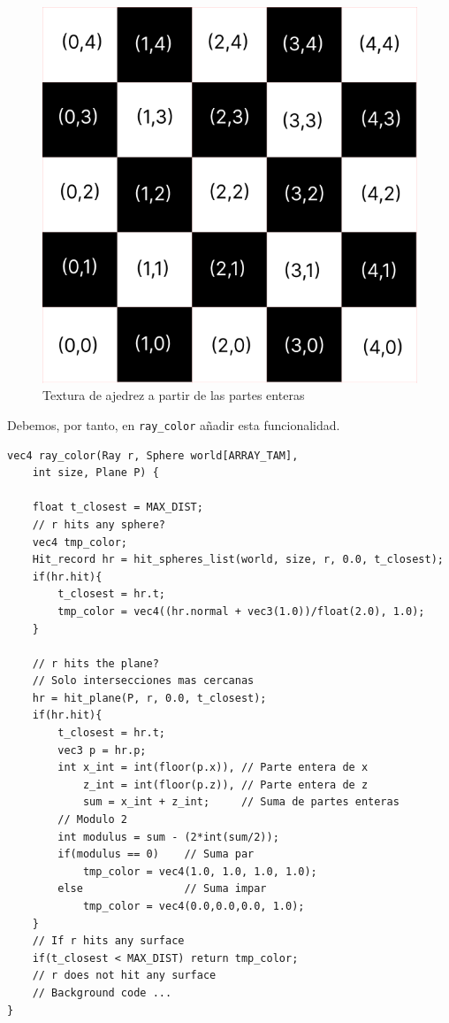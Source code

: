 \begin{figure} [ht]
    \centering
    \includegraphics[scale = 0.25]{img/C7/ajedrez.png}
    \caption{Textura de ajedrez a partir de las partes enteras}
    \label{fig:ajedrez}
\end{figure}

Debemos, por tanto, en \verb|ray_color| añadir esta funcionalidad.

\begin{lstlisting}
vec4 ray_color(Ray r, Sphere world[ARRAY_TAM], 
    int size, Plane P) {
    
    float t_closest = MAX_DIST;   
    // r hits any sphere?
    vec4 tmp_color;
    Hit_record hr = hit_spheres_list(world, size, r, 0.0, t_closest);
    if(hr.hit){
        t_closest = hr.t;
        tmp_color = vec4((hr.normal + vec3(1.0))/float(2.0), 1.0);
    }

    // r hits the plane? 
    // Solo intersecciones mas cercanas
    hr = hit_plane(P, r, 0.0, t_closest);
    if(hr.hit){
        t_closest = hr.t;
        vec3 p = hr.p;
        int x_int = int(floor(p.x)), // Parte entera de x
            z_int = int(floor(p.z)), // Parte entera de z
            sum = x_int + z_int;     // Suma de partes enteras
        // Modulo 2
        int modulus = sum - (2*int(sum/2));
        if(modulus == 0)    // Suma par
            tmp_color = vec4(1.0, 1.0, 1.0, 1.0);
        else                // Suma impar
            tmp_color = vec4(0.0,0.0,0.0, 1.0);
    }
    // If r hits any surface
    if(t_closest < MAX_DIST) return tmp_color;
    // r does not hit any surface
    // Background code ... 
}
\end{lstlisting}

